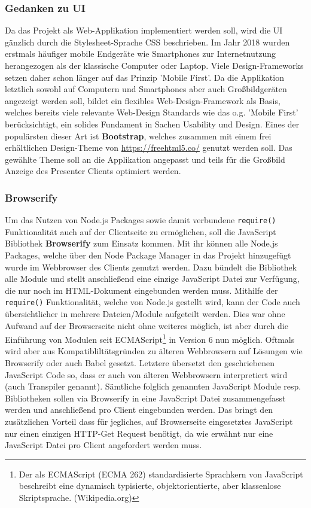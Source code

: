 \subsubsection{Gedanken zu UI}\label{sec:uientwurf}
Da das Projekt als Web-Applikation implementiert werden soll, wird die UI gänzlich durch die Stylesheet-Sprache CSS beschrieben. Im Jahr 2018 wurden erstmals häufiger mobile Endgeräte wie Smartphones zur Internetnutzung herangezogen als der klassische Computer oder Laptop\cite{Rabe2019}. Viele Design-Frameworks setzen daher schon länger auf das Prinzip 'Mobile First'. Da die Applikation letztlich sowohl auf Computern und Smartphones aber auch Großbildgeräten angezeigt werden soll, bildet ein flexibles Web-Design-Framework als Basis, welches bereits viele relevante Web-Design Standards wie das o.g. 'Mobile First' berücksichtigt, ein solides Fundament in Sachen Usability und Design. Eines der populärsten dieser Art ist \textbf{Bootstrap}, welches zusammen mit einem frei erhältlichen Design-Theme von \url{https://freehtml5.co/} genutzt werden soll. Das gewählte Theme soll an die Applikation angepasst und teils für die Großbild Anzeige des Presenter Clients optimiert werden.  
\subsubsection{Browserify}\label{sec:browserify}
Um das Nutzen von Node.js Packages sowie damit verbundene \texttt{require()} Funktionalität auch auf der Clientseite zu ermöglichen, soll die JavaScript Bibliothek \textbf{Browserify} zum Einsatz kommen. Mit ihr können alle Node.js Packages, welche über den Node Package Manager in das Projekt hinzugefügt wurde im Webbrowser des Clients genutzt werden. Dazu bündelt die Bibliothek alle Module und stellt anschließend eine einzige JavaScript Datei zur Verfügung, die nur noch im HTML-Dokument eingebunden werden muss. Mithilfe der \texttt{require()} Funktionalität, welche von Node.js gestellt wird, kann der Code auch übersichtlicher in mehrere Dateien/Module aufgeteilt werden. Dies war ohne Aufwand auf der Browserseite nicht ohne weiteres möglich, ist aber durch die Einführung von Modulen seit ECMAScript\footnote{Der als ECMAScript (ECMA 262) standardisierte Sprachkern von JavaScript beschreibt eine dynamisch typisierte, objektorientierte, aber klassenlose Skriptsprache. (Wikipedia.org)} in Version 6  nun möglich. Oftmals wird aber aus Kompatibliltätsgründen  zu älteren Webbrowsern auf Lösungen wie Browserify oder auch Babel gesetzt. Letztere übersetzt den geschriebenen JavaScript Code so, dass er auch von älteren Webbrowsern interpretiert wird (auch Transpiler genannt). Sämtliche folglich genannten JavaScript Module resp. Bibliotheken sollen via Browserify in eine JavaScript Datei zusammengefasst werden und anschließend pro Client eingebunden werden. Das bringt den zusätzlichen Vorteil dass für jegliches, auf Browserseite eingesetztes JavaScript nur einen einzigen HTTP-Get Request benötigt, da wie erwähnt nur eine JavaScript Datei pro Client angefordert werden muss. 
